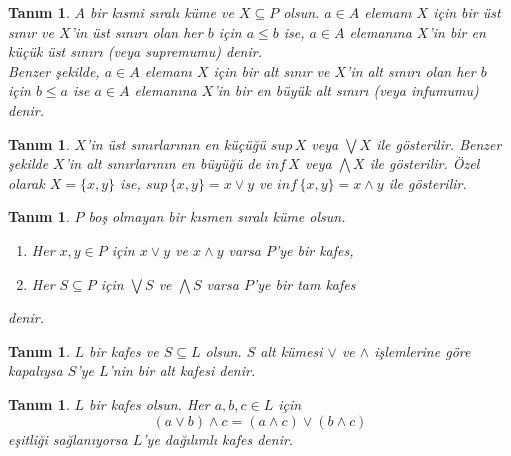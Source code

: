 \documentclass[a4paper,12pt]{article}
\numberwithin{equation}{section}
\theoremstyle{italik}
\newtheorem{tanim}[teorem]{Tanım}
\begin{document}
\begin{tanim}
     $ A $ bir kısmi sıralı küme ve $ X \subseteq P $ olsun. 
     $ a \in A $ elemanı $ X $ için bir üst sınır ve 
     $ X $'in üst sınırı olan her $ b $ için $ a \leq b $ ise, 
     $ a \in A $ elemanına $ X $'in bir \textit{en küçük üst sınırı} (veya \textit{supremumu}) denir. \\
     \indent Benzer şekilde, $ a \in A $ elemanı $ X $ için bir alt sınır ve 
     $ X $'in alt sınırı olan her $ b $ için $ b \leq a $ ise $ a \in A $ elemanına $ X $'in bir 
     \textit{en büyük alt sınırı} (veya \textit{infumumu}) denir.
\end{tanim}

\begin{tanim}
     $ X $'in üst sınırlarının en küçüğü $ sup\,X $ veya $ \bigvee X $ ile gösterilir. Benzer şekilde 
     $ X $'in alt sınırlarının en büyüğü de $ inf\,X $ veya $ \bigwedge X $ ile gösterilir. 
     Özel olarak $ X = \{x, y\} $ ise, 
     $ sup\,\{x, y\} = x \vee y $ ve $ inf\,\{x, y\} = x \wedge y $ ile gösterilir.  
\end{tanim}

\begin{tanim}
     $ P $ boş olmayan bir kısmen sıralı küme olsun. 
     \begin{enumerate}
          \itemsep 0em
          \item Her $ x, y \in P $ için $ x \vee y $ ve $ x \wedge y $ varsa $ P $'ye bir \textit{kafes},
          \item Her $ S \subseteq P $ için $ \bigvee S $ ve $ \bigwedge S $ varsa $ P $'ye bir \textit{tam kafes}
     \end{enumerate}
     denir.
\end{tanim}

\begin{tanim}
    $ L $ bir kafes ve $ S \subseteq L $ olsun. $ S $ alt kümesi $ \vee $ ve $ \wedge $ işlemlerine göre kapalıysa $ S $'ye 
    $ L $'nin bir \textit{alt kafesi} denir.
\end{tanim}




\begin{tanim}
$ L $ bir kafes olsun. Her $ a,b,c \in L $ için $$ ( a \vee b ) \wedge c = ( a \wedge c ) \vee ( b \wedge c ) $$
eşitliği sağlanıyorsa $ L $'ye \textit{dağılımlı kafes} denir.
\end{tanim}
\end{document}
